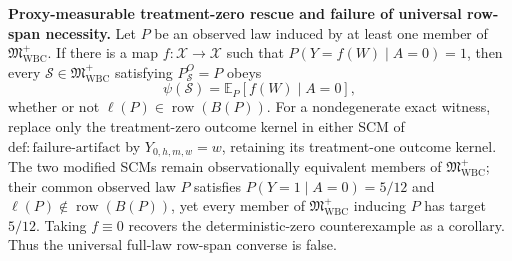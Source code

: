 \textbf{Proxy-measurable treatment-zero rescue and failure of universal row-span necessity.} Let \(P\) be an observed law induced by at least one member of \(\mathfrak M_{\mathrm{WBC}}^{+}\). If there is a map \(f:\mathcal X\to\mathcal X\) such that \(P(Y=f(W)\mid A=0)=1\), then every \(\mathcal S\in\mathfrak M_{\mathrm{WBC}}^{+}\) satisfying \(P_{\mathcal S}^O=P\) obeys
\[
\psi(\mathcal S)=\mathbb E_P[f(W)\mid A=0],
\]
whether or not \(\ell(P)\in\operatorname{row}(B(P))\). For a nondegenerate exact witness, replace only the treatment-zero outcome kernel in either SCM of \(\mathrm{def{:}failure\text{-}artifact}\) by \(Y_{0,h,m,w}=w\), retaining its treatment-one outcome kernel. The two modified SCMs remain observationally equivalent members of \(\mathfrak M_{\mathrm{WBC}}^{+}\); their common observed law \(P\) satisfies \(P(Y=1\mid A=0)=5/12\) and \(\ell(P)\notin\operatorname{row}(B(P))\), yet every member of \(\mathfrak M_{\mathrm{WBC}}^{+}\) inducing \(P\) has target \(5/12\). Taking \(f\equiv0\) recovers the deterministic-zero counterexample as a corollary. Thus the universal full-law row-span converse is false.